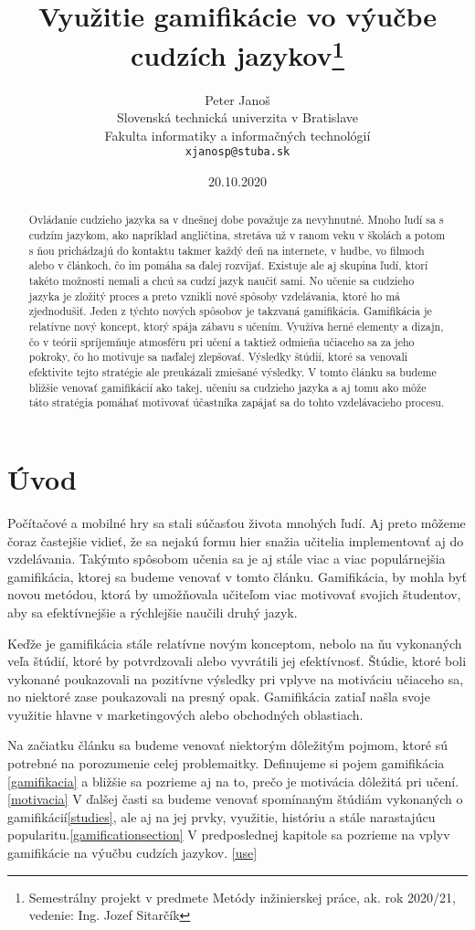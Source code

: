 \documentclass[10pt,oneside,slovak,a4paper]{article}
\title{Využitie gamifikácie vo výučbe cudzích jazykov\thanks{Semestrálny projekt v predmete Metódy inžinierskej práce, ak. rok 2020/21, vedenie: Ing. Jozef Sitarčík}} %
\author{Peter Janoš\\[2pt]
	{\small Slovenská technická univerzita v Bratislave}\\
	{\small Fakulta informatiky a informačných technológií}\\
	{\small \texttt{xjanosp@stuba.sk}}
	}
\date{\small 20.10.2020} %
\begin{document}
\maketitle

\begin{abstract}
Ovládanie cudzieho jazyka sa v dnešnej dobe považuje za nevyhnutné. Mnoho ľudí sa s cudzím jazykom, ako napríklad angličtina, stretáva už v ranom veku v školách a potom s ňou prichádzajú do kontaktu takmer každý deň na internete, v hudbe, vo filmoch alebo v článkoch, čo im pomáha sa ďalej rozvíjať. Existuje ale aj skupina ľudí, ktorí takéto možnosti nemali a chcú sa cudzí jazyk naučiť sami. No učenie sa cudzieho jazyka je zložitý proces a preto vznikli nové spôsoby vzdelávania, ktoré ho má zjednodušiť. Jeden z týchto nových spôsobov je takzvaná gamifikácia. Gamifikácia je relatívne nový koncept, ktorý spája zábavu s učením. Využíva herné elementy a dizajn, čo v teórii spríjemňuje atmosféru pri učení a taktiež odmieňa učiaceho sa za jeho pokroky, čo ho motivuje sa naďalej zlepšovať. Výsledky štúdií, ktoré sa venovali efektivite tejto stratégie ale preukázali zmiešané výsledky. V tomto článku sa budeme bližšie venovať gamifikácií ako takej, učeniu sa cudzieho jazyka a aj tomu ako môže táto stratégia pomáhať motivovať účastníka zapájať sa do tohto vzdelávacieho procesu.
\end{abstract}

\section{Úvod} \label{uvod}
Počítačové a mobilné hry sa stali súčasťou života mnohých ľudí. Aj preto môžeme čoraz častejšie vidieť, že sa nejakú formu hier snažia učitelia implementovať aj do vzdelávania. Takýmto spôsobom učenia sa je aj stále viac a viac populárnejšia gamifikácia, ktorej sa budeme venovať v tomto článku. Gamifikácia, by mohla byť novou metódou, ktorá by umožňovala učiteľom viac motivovať svojich študentov, aby sa efektívnejšie a rýchlejšie naučili druhý jazyk. 

Keďže je gamifikácia stále relatívne novým konceptom, nebolo na ňu vykonaných veľa štúdií, ktoré by potvrdzovali alebo vyvrátili jej efektívnosť. Štúdie, ktoré boli vykonané poukazovali na pozitívne výsledky pri vplyve na motiváciu učiaceho sa, no niektoré zase poukazovali na presný opak. Gamifikácia zatiaľ našla svoje využitie hlavne v marketingových alebo obchodných oblastiach.
~\cite{garland2015gamification}

Na začiatku článku sa budeme venovať niektorým dôležitým pojmom, ktoré sú potrebné na porozumenie celej problemaitky. Definujeme si pojem gamifikácia \ref{gamifikacia} a bližšie sa pozrieme aj na to, prečo je motivácia dôležitá pri učení.\ref{motivacia} V ďalšej časti sa budeme venovať spomínaným štúdiám vykonaných o gamifikácií\ref{studies}, ale aj na jej prvky, využitie, históriu a stále narastajúcu popularitu.\ref{gamificationsection} V predposlednej kapitole sa pozrieme na vplyv gamifikácie na výučbu cudzích jazykov. \ref{use}
\end{document}
